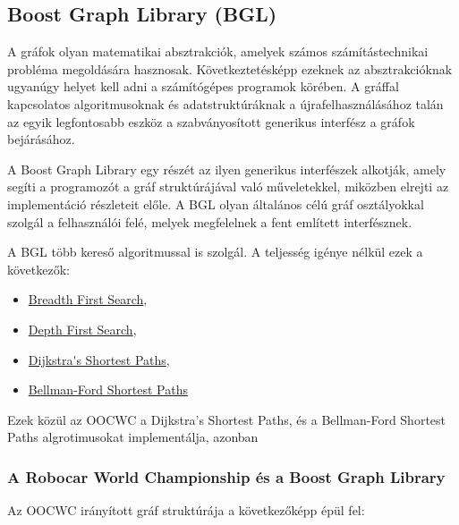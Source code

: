 \documentclass[a4paper,12pt]{report}
\begin{document}
\subsection{Boost Graph Library (BGL)}
\label{bgl}

A gráfok olyan matematikai absztrakciók, amelyek számos számítástechnikai probléma megoldására hasznosak. Következtetésképp ezeknek az absztrakcióknak ugyanúgy helyet kell adni a számítógépes programok körében. A gráffal kapcsolatos algoritmusoknak és adatstruktúráknak a újrafelhasználásához talán az egyik legfontosabb eszköz a szabványosított generikus interfész a gráfok bejárásához. 

\vspace{2mm}
A Boost Graph Library egy részét az ilyen generikus interfészek alkotják, amely segíti a programozót a gráf struktúrájával való műveletekkel, miközben elrejti az implementáció részleteit előle. A BGL olyan általános célú gráf osztályokkal szolgál a felhasználói felé, melyek megfelelnek a fent említett interfésznek.

\vspace{2mm}
A BGL több kereső algoritmussal is szolgál. A teljesség igénye nélkül ezek a következők:
\begin{itemize}
\item \url{Breadth First Search},
\item \url{Depth First Search},
\item \url{Dijkstra's Shortest Paths},
\item \url{Bellman-Ford Shortest Paths}
\end{itemize}

Ezek közül az OOCWC a Dijkstra's Shortest Paths, és a Bellman-Ford Shortest Paths algrotimusokat implementálja, azonban

\subsubsection{A Robocar World Championship és a Boost Graph Library}
\label{oocwcbgl}

Az OOCWC irányított gráf struktúrája a következőképp épül fel:


\end{document}
